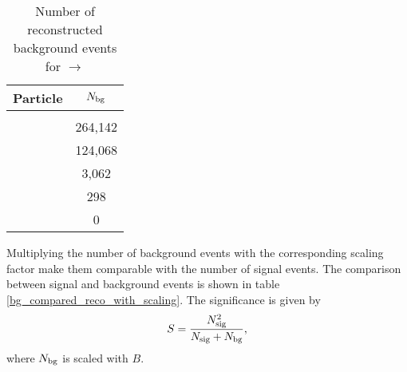 \begin{table}
	\centering
	\caption{Number of reconstructed background events for \pbarpSystem $\rightarrow$ \excitedcascade \anticascade }
	\label{tab:bg_reco_without_scaling}
	\begin{tabular}{lc}
		\hline
		Particle & $N_{\textnormal{bg}}$ \\
		\hline
		\hline
		&\\
		\lam & 264,142\\
		\alam & 124,068\\
		\anticascade & 3,062\\
		\excitedcascade & 298\\
		\excitedcascade \anticascade & 0\\
		\hline
		 
		  
	\end{tabular}
\end{table}
Multiplying the number of background events with the corresponding scaling factor make them comparable with the number of signal events.
The comparison between signal and background events is shown in table \ref{bg_compared_reco_with_scaling}.
The significance is given by
\begin{equation}
	\nonumber
	S = \frac{N^{2}_{\textnormal{sig}}}{N_{\textnormal{sig}}+N_{\textnormal{bg}}},
\end{equation}
where $N_{\textnormal{bg}}$ is scaled with $B$.

